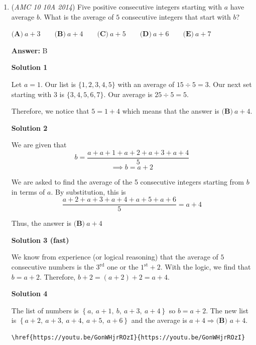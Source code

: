 \begin{enumerate}
 \begin{verbatim}
\href{https://youtu.be/ZvoMN5tJHBk}{https://youtu.be/ZvoMN5tJHBk}
\end{verbatim}





	\item (\textit{AMC 10 10A 2014}) Five positive consecutive integers starting with $a$ have average $b$. What is the average of $5$ consecutive integers that start with $b$?


 $\textbf{(A)}\ a+3\qquad\textbf{(B)}\ a+4\qquad\textbf{(C)}\ a+5\qquad\textbf{(D)}\ a+6\qquad\textbf{(E)}\ a+7$

 \textbf{Answer: }B



\textbf{Solution 1}

Let $a=1$. Our list is $\{1,2,3,4,5\}$ with an average of $15\div 5=3$. Our next set starting with $3$ is $\{3,4,5,6,7\}$. Our average is $25\div 5=5$.

 Therefore, we notice that $5=1+4$ which means that the answer is $\boxed{\textbf{(B)}\ a+4}$.

 



\textbf{Solution 2}

We are given that 
 \[b=\frac{a+a+1+a+2+a+3+a+4}{5}\]
 \[\implies b =a+2\]

 We are asked to find the average of the 5 consecutive integers starting from $b$ in terms of $a$. By substitution, this is 
 \[\frac{a+2+a+3+a+4+a+5+a+6}5=a+4\]

 Thus, the answer is $\boxed{\textbf{(B)}\ a+4}$




\textbf{Solution 3 (fast)}

We know from experience (or logical reasoning) that the average of $5$ consecutive numbers is the $3^\text{rd}$ one or the $1^\text{st} + 2$. With the logic, we find that $b=a+2$. Therefore, $b+2=(a+2)+2=\boxed{a+4}$.

 



\textbf{Solution 4}

The list of numbers is $\left\{a,\ a+1,\ b,\ a+3,\ a+4\right\}$ so $b=a+2$. The new list is $\left\{a+2,\ a+3,\ a+4,\ a+5,\ a+6\right\}$ and the average is $a+4 \Longrightarrow \boxed{\textbf{(B) } a+4}$.

 \begin{verbatim}
\href{https://youtu.be/GonWHjrROzI}{https://youtu.be/GonWHjrROzI}
\end{verbatim}






\end{enumerate}
